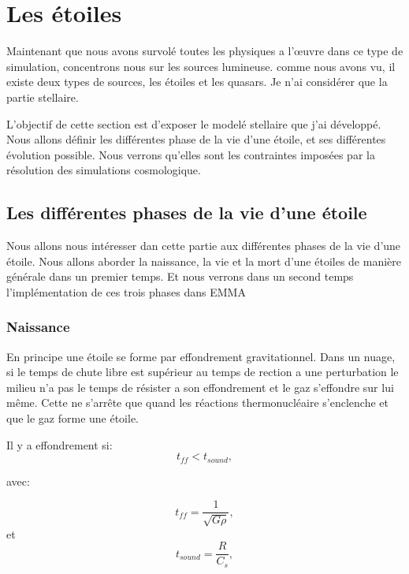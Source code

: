 \chapter{Les étoiles}
\label{sec:etoiles}

Maintenant que nous avons survolé toutes les physiques a l’œuvre dans ce type de simulation, concentrons nous sur les sources lumineuse.
comme nous avons vu, il existe deux types de sources, les étoiles et les quasars. %
Je n'ai considérer que la partie stellaire.

L'objectif de cette section est d'exposer le modelé stellaire que j'ai développé.
Nous allons définir les différentes phase de la vie d'une étoile, et ses différentes évolution possible.
Nous verrons qu'elles sont les contraintes imposées par la résolution des simulations cosmologique.



\section{Les différentes phases de la vie d'une étoile}

Nous allons nous intéresser dan cette partie aux différentes phases de la vie d'une étoile.
Nous allons aborder la naissance, la vie et la mort d'une étoiles de manière générale dans un premier temps.
Et nous verrons dans un second temps l'implémentation de ces trois phases dans EMMA 

\subsection{Naissance}


En principe une étoile se forme par effondrement gravitationnel.
Dans un nuage, si le temps de chute libre est supérieur au temps de rection a une perturbation le milieu n'a pas le temps de résister a son effondrement et le gaz s'effondre sur lui même.
Cette ne s'arrête que quand les réactions thermonucléaire s'enclenche et que le gaz forme une étoile.

Il y a effondrement si:
\begin{equation}
t_{ff} < t_{sound},
\end{equation}

avec:
 
\begin{equation}
t_{ff} = \frac{1}{\sqrt{G \rho}},
\end{equation}
et
\begin{equation}
t_{sound} = \frac{R}{C_s},
\end{equation}

